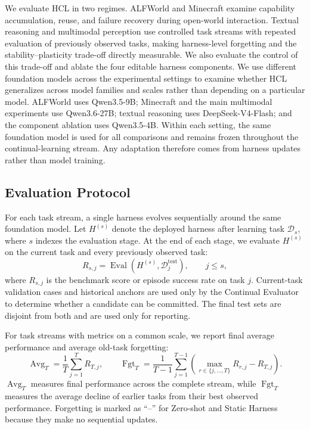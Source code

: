 \documentclass{article}
\begin{document}
We evaluate HCL in two regimes. ALFWorld \citep{alfworld} and Minecraft \citep{voyager} examine capability accumulation, reuse, and failure recovery during open-world interaction.
Textual reasoning and multimodal perception use controlled task streams with
repeated evaluation of previously observed tasks, making harness-level
forgetting and the stability--plasticity trade-off directly measurable. We
also evaluate the control of this trade-off and ablate the four editable
harness components.
We use different foundation models across the experimental settings to examine
whether HCL generalizes across model families and scales rather than depending
on a particular model. ALFWorld uses Qwen3.5-9B; Minecraft and the main
multimodal experiments use Qwen3.6-27B; textual reasoning uses
DeepSeek-V4-Flash; and the component ablation uses Qwen3.5-4B. Within each
setting, the same foundation model is used for all comparisons and remains
frozen throughout the continual-learning stream. Any adaptation therefore
comes from harness updates rather than model training.

\subsection{Evaluation Protocol}
\label{sec:experimental_setup}

For each task stream, a single harness evolves sequentially around the same
foundation model. Let $H^{(s)}$ denote the deployed harness after learning task
$\mathcal{D}_s$, where $s$ indexes the evaluation stage. At the end of each
stage, we evaluate $H^{(s)}$ on the current task and every previously observed
task:
\begin{equation}
\label{eq:exp_performance}
R_{s,j}
=
\operatorname{Eval}
\left(
H^{(s)},
\mathcal{D}^{\mathrm{test}}_j
\right),
\qquad
j \leq s,
\end{equation}
where $R_{s,j}$ is the benchmark score or episode success rate on task $j$.
Current-task validation cases and historical anchors are used only by the
Continual Evaluator to determine whether a candidate can be committed. The
final test sets are disjoint from both and are used only for reporting.

For task streams with metrics on a common scale, we report final average
performance and average old-task forgetting:
\begin{equation}
\label{eq:exp_metrics}
\operatorname{Avg}_T
=
\frac{1}{T}
\sum_{j=1}^{T}
R_{T,j},
\qquad
\operatorname{Fgt}_T
=
\frac{1}{T-1}
\sum_{j=1}^{T-1}
\left(
\max_{r\in\{j,\ldots,T\}}
R_{r,j}
-
R_{T,j}
\right).
\end{equation}
$\operatorname{Avg}_T$ measures final performance across the complete stream,
while $\operatorname{Fgt}_T$ measures the average decline of earlier tasks
from their best observed performance. Forgetting is marked as ``--''
for Zero-shot and Static Harness because they make no sequential updates.
\end{document}
